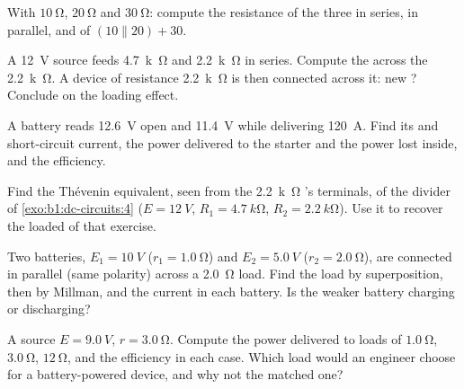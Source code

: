 \begin{exercise}[$\star$]\label{exo:b1:dc-circuits:3}
With $\qty{10}{\ohm}$, $\qty{20}{\ohm}$ and $\qty{30}{\ohm}$: compute
the resistance of the three in series, in parallel, and of
$(10 \parallel 20) + 30$.
\end{exercise}

\begin{exercise}[$\star$]\label{exo:b1:dc-circuits:4}
A \qty{12}{V} source feeds \qty{4.7}{k\ohm} and \qty{2.2}{k\ohm} in
series. Compute the  across the \qty{2.2}{k\ohm}. A device of
resistance \qty{2.2}{k\ohm} is then connected across it: new ?
Conclude on the loading effect.
\end{exercise}

\begin{exercise}[$\star\star$]\label{exo:b1:dc-circuits:5}
A battery reads \qty{12.6}{V} open and \qty{11.4}{V} while delivering
\qty{120}{A}. Find its  and short-circuit current,
the power delivered to the starter and the power lost inside, and the
efficiency.
\end{exercise}

\begin{exercise}[$\star\star$]\label{exo:b1:dc-circuits:6}
Find the Thévenin equivalent, seen from the \qty{2.2}{k\ohm}
's terminals, of the divider of \cref{exo:b1:dc-circuits:4}
($E = \qty{12}{V}$, $R_1 = \qty{4.7}{k\ohm}$, $R_2 = \qty{2.2}{k\ohm}$).
Use it to recover the loaded  of that exercise.
\end{exercise}

\begin{exercise}[$\star\star$]\label{exo:b1:dc-circuits:7}
Two batteries, $E_1 = \qty{10}{V}$ ($r_1 = \qty{1.0}{\ohm}$) and
$E_2 = \qty{5.0}{V}$ ($r_2 = \qty{2.0}{\ohm}$), are connected in
parallel (same polarity) across a \qty{2.0}{\ohm} load. Find the load
 by superposition, then by Millman, and the current in each
battery. Is the weaker battery charging or discharging?
\end{exercise}

\begin{exercise}[$\star\star$]\label{exo:b1:dc-circuits:8}
A source $E = \qty{9.0}{V}$, $r = \qty{3.0}{\ohm}$. Compute the power
delivered to loads of $\qty{1.0}{\ohm}$, $\qty{3.0}{\ohm}$, $\qty{12}{\ohm}$,
and the efficiency in each case. Which load would an engineer choose for
a battery-powered device, and why not the matched one?
\end{exercise}

